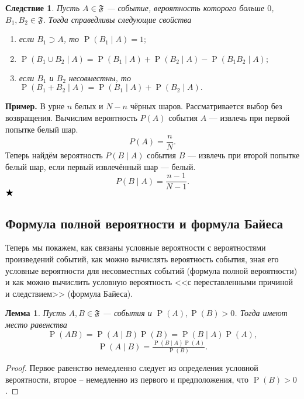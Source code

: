 \documentclass[12pt]{article}
\newtheorem{lemma}[theorem]{Лемма}
\newtheorem{corollary}[theorem]{Следствие}
\numberwithin{theorem}{section}
\theoremstyle{definition}
\newenvironment{example}{\indent \textbf{Пример.}}{$ \hfill \bigstar $}
\newcommand{\prob}{\operatorname{P}}
\newcommand{\events}{\mathfrak{F}}
\begin{document}
	\begin{corollary}
		Пусть $ A \in \events $ --- событие, вероятность которого больше $ 0 $, $ B_1, B_2 \in \events $.
		Тогда справедливы следующие свойства
		\begin{enumerate}
			\item если $ B_1 \supset A $, то $ \prob(B_1 \mid A) = 1; $
			\item $ \prob(B_1 \cup B_2 \mid A) = \prob(B_1 \mid A) + \prob(B_2 \mid A) - \prob(B_1B_2 \mid A); $
			\item если $ B_1 $ и $ B_2 $ несовместны, то $ \prob(B_1 + B_2 \mid A) = \prob(B_1 \mid A) + \prob(B_2 \mid A). $
		\end{enumerate}
	\end{corollary}
	
	\begin{example}
		В урне $n$ белых и $N - n$ чёрных шаров. Рассматривается выбор без возвращения.  
		Вычислим вероятность $P(A)$ события $A$ — извлечь при первой попытке белый шар.
		\[
		P(A) = \frac{n}{N}.
		\]
		Теперь найдём вероятность $P(B \mid A)$ события $B$ — извлечь при второй попытке белый шар, если первый извлечённый шар — белый.
		\[
		P(B \mid A) = \frac{n - 1}{N - 1}.
		\]
	\end{example}
	
	\subsection{Формула полной вероятности и формула Байеса}
	
	Теперь мы покажем, как связаны условные вероятности с вероятностями произведений событий, 
	как можно вычислять вероятность события, зная его условные вероятности для несовместных событий (формула полной вероятности)
	и как можно вычислить условную вероятность <<с переставленными причиной и следствием>> (формула Байеса).
	
	\begin{lemma} \label{cond prob}
		Пусть $ A, B \in \events $ --- события и $ \prob(A), \prob(B) > 0 $.
		Тогда имеют место равенства
		$$ \prob(AB) = \prob(A \mid B)\prob(B) = \prob(B \mid A)\prob(A), $$
		$$ \prob(A \mid B) = \tfrac{\prob(B \mid A)\prob(A)}{\prob(B)}. $$
	\end{lemma}
	
	\begin{proof}
		Первое равенство немедленно следует из определения условной вероятности, второе -- немедленно из первого
		и предположения, что $ \prob(B) > 0 $.
	\end{proof}
	
\end{document}
